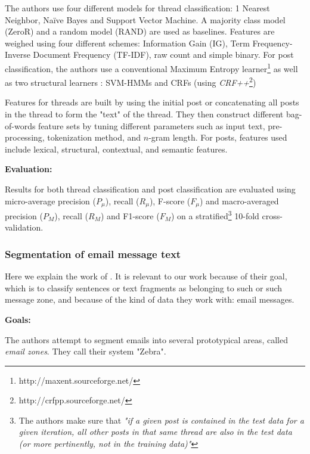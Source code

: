 \documentclass[11pt]{article}
\begin{document}
The authors use four different models for thread classification: 1 Nearest Neighbor, Naïve Bayes and Support Vector Machine. A majority class model (ZeroR) and a random model (RAND) are used as baselines. Features are weighed using four different schemes: Information Gain (IG), Term Frequency-Inverse Document Frequency (TF-IDF), raw count and simple binary. For post classification, the authors use a conventional Maximum Entropy learner\footnote{http://maxent.sourceforge.net/} as well as two structural learners : SVM-HMMs and CRFs (using \emph{CRF++}\footnote{http://crfpp.sourceforge.net/
})

Features for threads are built by using the initial post or concatenating all posts in the thread to form the "text" of the thread. They then construct different bag-of-words feature sets by tuning different parameters such as input text, pre-processing, tokenization method, and $n$-gram length. For posts, features used include lexical, structural, contextual, and semantic features.

\vspace{0.5cm}
\textbf{Evaluation:}
\vspace{0.1cm}

Results for both thread classification and post classification are evaluated using micro-average precision ($P_{\mu}$), recall ($R_{\mu}$), F-score ($F_{\mu}$) and macro-averaged precision ($P_{M}$), recall ($R_{M}$) and F1-score ($F_{M}$) on a stratified\footnote{The authors make sure that \textit{"if a given post is contained in the test data for a given iteration, all other posts in that same thread are also in the test data (or more pertinently, not in the training data)"}} 10-fold cross-validation.

\subsubsection{Segmentation of email message text}

Here we explain the work of \cite{lampert2009segmenting}. It is relevant to our work because of their goal, which is to classify sentences or text fragments as belonging to such or such message zone, and because of the kind of data they work with: email messages.

\vspace{0.5cm}
\textbf{Goals:}
\vspace{0.1cm}

The authors attempt to segment emails into several prototypical areas, called \textit{email zones}. They call their system "Zebra".
\end{document}
